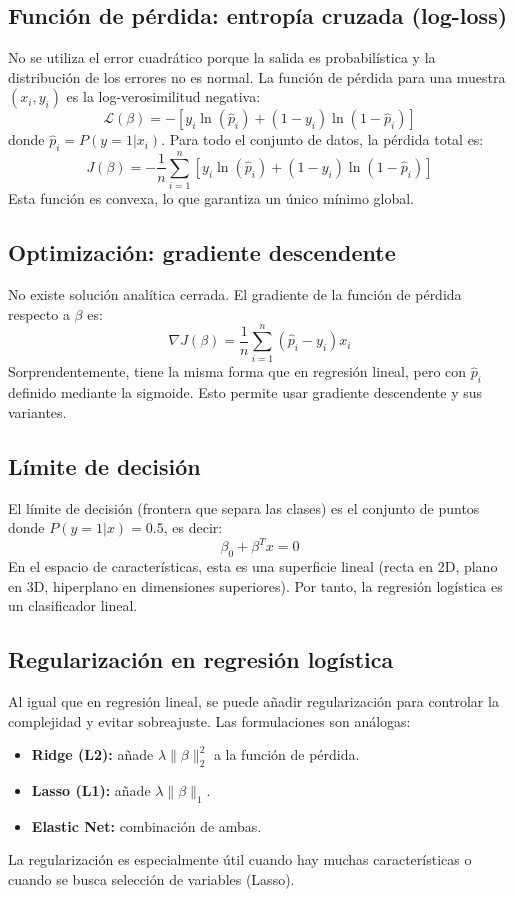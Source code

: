 \documentclass[12pt,a4paper,openany,oneside]{book}
\begin{document}
\subsection{Función de pérdida: entropía cruzada (log-loss)}
No se utiliza el error cuadrático porque la salida es probabilística y la distribución de los errores no es normal. La función de pérdida para una muestra \((x_i, y_i)\) es la log-verosimilitud negativa:
\[
\mathcal{L}(\beta) = - \left[ y_i \ln(\hat{p}_i) + (1 - y_i) \ln(1 - \hat{p}_i) \right]
\]
donde \(\hat{p}_i = P(y=1|x_i)\). Para todo el conjunto de datos, la pérdida total es:
\[
J(\beta) = -\frac{1}{n} \sum_{i=1}^n \left[ y_i \ln(\hat{p}_i) + (1 - y_i) \ln(1 - \hat{p}_i) \right]
\]
Esta función es convexa, lo que garantiza un único mínimo global.

\subsection{Optimización: gradiente descendente}
No existe solución analítica cerrada. El gradiente de la función de pérdida respecto a \(\beta\) es:
\[
\nabla J(\beta) = \frac{1}{n} \sum_{i=1}^n (\hat{p}_i - y_i) x_i
\]
Sorprendentemente, tiene la misma forma que en regresión lineal, pero con \(\hat{p}_i\) definido mediante la sigmoide. Esto permite usar gradiente descendente y sus variantes.

\subsection{Límite de decisión}
El límite de decisión (frontera que separa las clases) es el conjunto de puntos donde \(P(y=1|x) = 0.5\), es decir:
\[
\beta_0 + \beta^T x = 0
\]
En el espacio de características, esta es una superficie lineal (recta en 2D, plano en 3D, hiperplano en dimensiones superiores). Por tanto, la regresión logística es un clasificador lineal.

\subsection{Regularización en regresión logística}
Al igual que en regresión lineal, se puede añadir regularización para controlar la complejidad y evitar sobreajuste. Las formulaciones son análogas:
\begin{itemize}
    \item \textbf{Ridge (L2):} añade \(\lambda \|\beta\|_2^2\) a la función de pérdida.
    \item \textbf{Lasso (L1):} añade \(\lambda \|\beta\|_1\).
    \item \textbf{Elastic Net:} combinación de ambas.
\end{itemize}
La regularización es especialmente útil cuando hay muchas características o cuando se busca selección de variables (Lasso).
\end{document}
